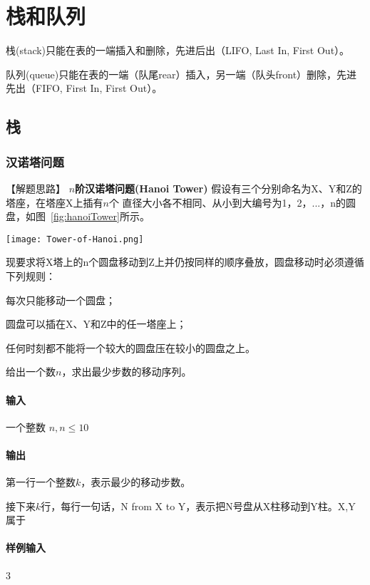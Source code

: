 \chapter{栈和队列}

栈(stack)只能在表的一端插入和删除，先进后出（LIFO, Last In, First Out）。

队列(queue)只能在表的一端（队尾rear）插入，另一端（队头front）删除，先进先出（FIFO, First In, First Out）。

\section{栈} %


\subsection{汉诺塔问题}


【解题思路】
\textbf{$n$阶汉诺塔问题(Hanoi Tower)} 假设有三个分别命名为X、Y和Z的塔座，在塔座X上插有$n$个
直径大小各不相同、从小到大编号为1，2，...，n的圆盘，如图~\ref{fig:hanoiTower}所示。

\begin{center}
\texttt{[image: Tower-of-Hanoi.png]}\\
\label{fig:hanoiTower}
\end{center}


现要求将X塔上的n个圆盘移动到Z上并仍按同样的顺序叠放，圆盘移动时必须遵循下列规则：
\begindot
\item 每次只能移动一个圆盘；
\item 圆盘可以插在X、Y和Z中的任一塔座上；
\item 任何时刻都不能将一个较大的圆盘压在较小的圆盘之上。
\myenddot
 
给出一个数$n$，求出最少步数的移动序列。


\subsubsection{输入}
一个整数 $n, n \leq 10$


\subsubsection{输出}
第一行一个整数$k$，表示最少的移动步数。

接下来$k$行，每行一句话，N from X to Y，表示把N号盘从X柱移动到Y柱。X,Y 属于


\subsubsection{样例输入}
\begin{Code}
3
\end{Code}


